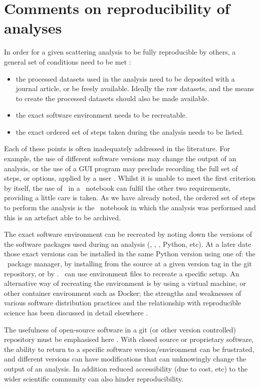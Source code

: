 \documentclass[pdf,preprint]{iucr}
\begin{document}
\section{Comments on reproducibility of analyses}

In order for a given scattering analysis to be fully reproducible by others, a general set of conditions need to be met \cite{Helliwell2017, Moeller2017a}:
\begin{itemize}
  \item the processed datasets used in the analysis need to be deposited with a journal article, or be freely available. Ideally the raw datasets, and the means to create the processed datasets should also be made available.
  \item the exact software environment needs to be recreatable.
  \item the exact ordered set of steps taken during the analysis needs to be listed.
\end{itemize} 
Each of these points is often inadequately addressed in the literature. For example, the use of different software versions may change the output of an analysis, or the use of a GUI program may preclude recording the full set of steps, or options, applied by a user \cite{Chirigati2013}. Whilst it is unable to meet the first criterion by itself, the use of \ in a \Jupyter\ notebook can fulfil the other two requirements, providing a little care is taken. As we have already noted, the ordered set of steps to perform the analysis is the \Jupyter\ notebook in which the analysis was performed and this is an artefact able to be archived.

The exact software environment can be recreated by noting down the versions of the software packages used during an analysis (, \SciPy, \NumPy, Python, etc). At a later date those exact versions can be installed in the same Python version using one of: the \conda\ package manager, by installing from the source at a given version tag in the git repository, or by \pip. \conda\ can use environment files to recreate a specific setup. An alternative way of recreating the environment is by using a virtual machine, or other container environment such as Docker; the strengths and weaknesses of various software distribution practices and the relationship with reproducible science has been discussed in detail elsewhere \cite{Moeller2017a}.

The usefulness of open-source software in a git (or other version controlled) repository must be emphasised here \cite{Moeller2017a}. With closed source or proprietary software, the ability to return to a specific software version/environment can be frustrated, and different versions can have modifications that can unknowingly change the output of an analysis. In addition reduced accessibility (due to cost, etc) to the wider scientific community can also hinder reproducibility.
\end{document}
